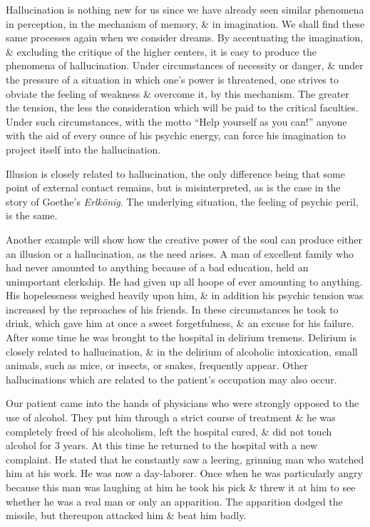 \documentclass{article}
\begin{document}
Hallucination is nothing new for us since we have already seen similar phenomena in perception, in the mechanism of memory, \& in imagination. We shall find these same processes again when we consider dreams. By accentuating the imagination, \& excluding the critique of the higher centers, it is easy to produce the phenomena of hallucination. Under circumstances of necessity or danger, \& under the pressure of a situation in which one's power is threatened, one strives to obviate the feeling of weakness \& overcome it, by this mechanism. The greater the tension, the less the consideration which will be paid to the critical faculties. Under such circumstances, with the motto ``Help yourself as you can!'' anyone with the aid of every ounce of his psychic energy, can force his imagination to project itself into the hallucination.

Illusion is closely related to hallucination, the only difference being that some point of external contact remains, but is misinterpreted, as is the case in the story of Goethe's {\it Erlk\"onig}. The underlying situation, the feeling of psychic peril, is the same.

Another example will show how the creative power of the soul can produce either an illusion or a hallucination, as the need arises. A man of excellent family who had never amounted to anything because of a bad education, held an unimportant clerkship. He had given up all hoope of ever amounting to anything. His hopelessness weighed heavily upon him, \& in addition his psychic tension was increased by the reproaches of his friends. In these circumstances he took to drink, which gave him at once a sweet forgetfulness, \& an excuse for his failure. After some time he was brought to the hospital in delirium tremens. Delirium is closely related to hallucination, \& in the delirium of alcoholic intoxication, small animals, such as mice, or insects, or snakes, frequently appear. Other hallucinations which are related to the patient's occupation may also occur.

Our patient came into the hands of physicians who were strongly opposed to the use of alcohol. They put him through a strict course of treatment \& he was completely freed of his alcoholism, left the hospital cured, \& did not touch alcohol for 3 years. At this time he returned to the hospital with a new complaint. He stated that he constantly saw a leering, grinning man who watched him at his work. He was now a day-laborer. Once when he was particularly angry because this man was laughing at him he took his pick \& threw it at him to see whether he was a real man or only an apparition. The apparition dodged the missile, but thereupon attacked him \& beat him badly.
\end{document}
